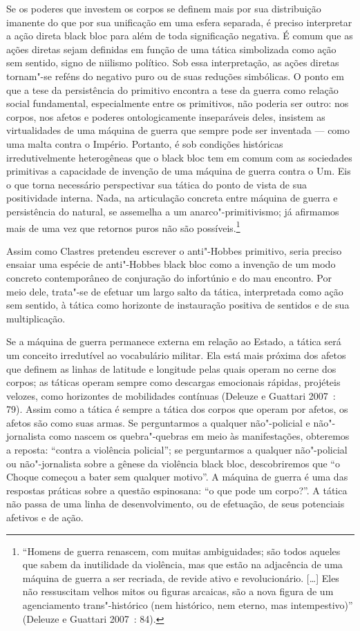 Se os poderes que investem os corpos se definem
mais por sua distribuição imanente do que por sua unificação em uma
esfera separada, é preciso interpretar a ação direta black bloc para
além de toda significação negativa. É comum que as ações diretas sejam
definidas em função de uma tática simbolizada como ação sem sentido,
signo de niilismo político. Sob essa interpretação, as ações diretas
tornam"-se reféns do negativo puro ou de suas reduções simbólicas. O
ponto em que a tese da persistência do primitivo encontra a tese da
guerra como relação social fundamental, especialmente entre os
primitivos, não poderia ser outro: nos corpos, nos afetos e poderes
ontologicamente inseparáveis deles, insistem as virtualidades de uma
máquina de guerra que sempre pode ser inventada --- como uma malta contra
o Império. Portanto, é sob condições históricas irredutivelmente
heterogêneas que o black bloc tem em comum com as sociedades primitivas
a capacidade de invenção de uma máquina de guerra contra o Um. Eis o que
torna necessário perspectivar sua tática do ponto de vista de sua
positividade interna. Nada, na articulação concreta entre máquina de
guerra e persistência do natural, se assemelha a um anarco"-primitivismo;
já afirmamos mais de uma vez que retornos puros não são
possíveis.\footnote{``Homens de guerra
  renascem, com muitas ambiguidades; são todos aqueles que sabem da
  inutilidade da violência, mas que estão na adjacência de uma máquina
  de guerra a ser recriada, de revide ativo e revolucionário. {[}\ldots{}{]}
  Eles não ressuscitam velhos mitos ou figuras arcaicas, são a nova
  figura de um agenciamento trans"-histórico (nem histórico, nem eterno,
  mas intempestivo)'' (Deleuze e Guattari 2007~: 84).}

Assim como Clastres pretendeu escrever o anti"-Hobbes primitivo, seria
preciso ensaiar uma espécie de anti"-Hobbes black bloc como a invenção de
um modo concreto contemporâneo de conjuração do infortúnio e do mau
encontro. Por meio dele, trata"-se de efetuar um largo salto da tática,
interpretada como ação sem sentido, à tática como horizonte de
instauração positiva de sentidos e de sua multiplicação.

Se a máquina de guerra permanece externa em relação ao Estado, a tática
será um conceito irredutível ao vocabulário militar. Ela está mais
próxima dos afetos que definem as linhas de latitude e longitude pelas
quais operam no cerne dos corpos; as táticas operam sempre como
descargas emocionais rápidas, projéteis velozes, como horizontes de
mobilidades contínuas (Deleuze e Guattari 2007~: 79). Assim como a
tática é sempre a tática dos corpos que operam por afetos, os afetos são
como suas armas. Se perguntarmos a qualquer não"-policial e
não"-jornalista como nascem os quebra"-quebras em meio às manifestações,
obteremos a reposta: ``contra a violência policial''; se perguntarmos a
qualquer não"-policial ou não"-jornalista sobre a gênese da violência
black bloc, descobriremos que ``o Choque começou a bater sem qualquer
motivo''. A máquina de guerra é uma das respostas práticas sobre a
questão espinosana: ``o que pode um corpo?''. A tática não passa de uma
linha de desenvolvimento, ou de efetuação, de seus potenciais afetivos e
de ação.

